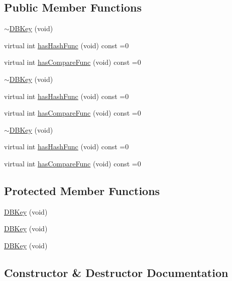 \subsection*{Public Member Functions}
\begin{DoxyCompactItemize}
\item 
\mbox{\hyperlink{classFILEDB_1_1DBKey_a5f8d52f7400d7723ab1093b46c3fbdf2}{$\sim$\+D\+B\+Key}} (void)
\item 
virtual int \mbox{\hyperlink{classFILEDB_1_1DBKey_a541dab4f4083ae951dee2f30483eb18e}{has\+Hash\+Func}} (void) const =0
\item 
virtual int \mbox{\hyperlink{classFILEDB_1_1DBKey_a416c32ba10caf76e6b7ff4986cfc3c05}{has\+Compare\+Func}} (void) const =0
\item 
\mbox{\hyperlink{classFILEDB_1_1DBKey_a5f8d52f7400d7723ab1093b46c3fbdf2}{$\sim$\+D\+B\+Key}} (void)
\item 
virtual int \mbox{\hyperlink{classFILEDB_1_1DBKey_a541dab4f4083ae951dee2f30483eb18e}{has\+Hash\+Func}} (void) const =0
\item 
virtual int \mbox{\hyperlink{classFILEDB_1_1DBKey_a416c32ba10caf76e6b7ff4986cfc3c05}{has\+Compare\+Func}} (void) const =0
\item 
\mbox{\hyperlink{classFILEDB_1_1DBKey_a5f8d52f7400d7723ab1093b46c3fbdf2}{$\sim$\+D\+B\+Key}} (void)
\item 
virtual int \mbox{\hyperlink{classFILEDB_1_1DBKey_a541dab4f4083ae951dee2f30483eb18e}{has\+Hash\+Func}} (void) const =0
\item 
virtual int \mbox{\hyperlink{classFILEDB_1_1DBKey_a416c32ba10caf76e6b7ff4986cfc3c05}{has\+Compare\+Func}} (void) const =0
\end{DoxyCompactItemize}
\subsection*{Protected Member Functions}
\begin{DoxyCompactItemize}
\item 
\mbox{\hyperlink{classFILEDB_1_1DBKey_a9cd02eea470fc674d8f237a1919168cf}{D\+B\+Key}} (void)
\item 
\mbox{\hyperlink{classFILEDB_1_1DBKey_a9cd02eea470fc674d8f237a1919168cf}{D\+B\+Key}} (void)
\item 
\mbox{\hyperlink{classFILEDB_1_1DBKey_a9cd02eea470fc674d8f237a1919168cf}{D\+B\+Key}} (void)
\end{DoxyCompactItemize}


\subsection{Constructor \& Destructor Documentation}
\mbox{\label{classFILEDB_1_1DBKey_a5f8d52f7400d7723ab1093b46c3fbdf2}} 
